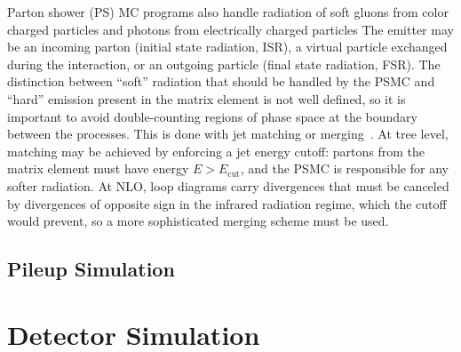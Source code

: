 Parton shower (PS) MC programs also handle radiation of soft gluons from color charged particles and photons from electrically charged particles
The emitter may be an incoming parton (initial state radiation, ISR), a virtual particle exchanged during the interaction, or an outgoing particle (final state radiation, FSR).
The distinction between ``soft'' radiation that should be handled by the PSMC and ``hard'' emission present in the matrix element is not well defined, so it is important to avoid double-counting regions of phase space at the boundary between the processes.
This is done with jet matching or merging~\cite{Alwall:2014hca,Olive:2016xmw}.
At tree level, matching may be achieved by enforcing a jet energy cutoff: partons from the matrix element must have energy $E > E_\text{cut}$, and the PSMC is responsible for any softer radiation.
At NLO, loop diagrams carry divergences that must be canceled by divergences of opposite sign in the infrared radiation regime, which the cutoff would prevent, so a more sophisticated merging scheme must be used.


\subsection{Pileup Simulation}




\section{Detector Simulation}
